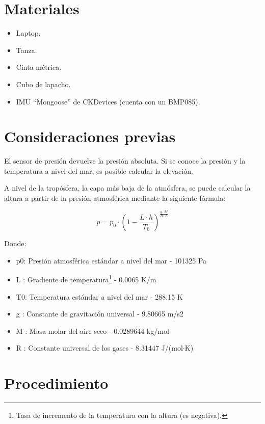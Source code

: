 \documentclass[spanish,12pt,a4paper,titlepage]{report}
\begin{document}
\newpage
\section{Materiales}
\label{sec:materiales}

\begin{itemize}
\item Laptop.
\item Tanza.
\item Cinta métrica.
\item Cubo de lapacho.
\item IMU ``Mongoose'' de CKDevices (cuenta con un BMP085).
\end{itemize}

\section{Consideraciones previas}
\label{consideraciones}

El sensor de presión devuelve la presión absoluta. Si se conoce la presión y la temperatura a nivel del mar, es posible calcular la elevación.

A nivel de la tropósfera, la capa más baja de la atmósfera, se puede calcular la altura a partir de la presión atmosférica mediante la siguiente fórmula\cite{bib:alt-press}:

\begin{equation}
  \label{eq:press-alt}
  p = p_0 \cdot \left(1 - \frac{L \cdot h}{T_0} \right)^\frac{g \cdot M}{R \cdot L}
\end{equation}

Donde:
\begin{itemize}
\item p0: 	Presión atmosférica estándar a nivel del mar -	101325 Pa
\item L :	Gradiente de temperatura\footnote{Tasa de incremento de la temperatura con la altura (es negativa).} -	0.0065 K/m
\item T0:	Temperatura estándar a nivel del mar -	288.15 K
\item g :	Constante de gravitación universal -	9.80665 m/s2
\item M :	Masa molar del aire seco -	0.0289644 kg/mol
\item R :	Constante universal de los gases - 	8.31447 J/(mol$\cdot$K)
\end{itemize}


\newpage
\section{Procedimiento}
\label{sec:procedimiento}
\end{document}
